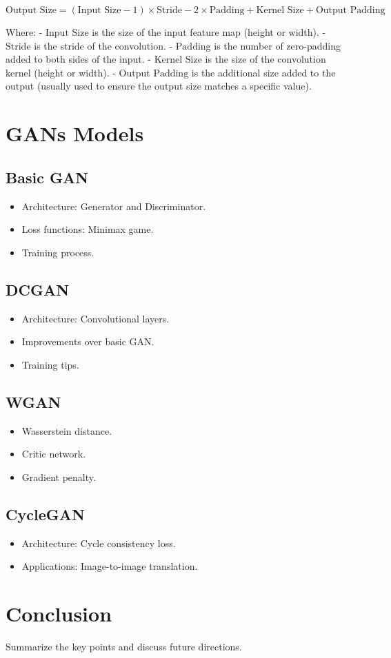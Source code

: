 \documentclass{article}
\begin{document}
\[ \text{Output Size} = (\text{Input Size} - 1) \times \text{Stride} - 2 \times \text{Padding} + \text{Kernel Size} + \text{Output Padding} \]

Where:
- \(\text{Input Size}\) is the size of the input feature map (height or width).
- \(\text{Stride}\) is the stride of the convolution.
- \(\text{Padding}\) is the number of zero-padding added to both sides of the input.
- \(\text{Kernel Size}\) is the size of the convolution kernel (height or width).
- \(\text{Output Padding}\) is the additional size added to the output (usually used to ensure the output size matches a specific value).


\section{GANs Models}
\label{sec:gans-models}
\subsection{Basic GAN}
\begin{itemize}
    \item Architecture: Generator and Discriminator.
    \item Loss functions: Minimax game.
    \item Training process.
\end{itemize}

\subsection{DCGAN}
\begin{itemize}
    \item Architecture: Convolutional layers.
    \item Improvements over basic GAN.
    \item Training tips.
\end{itemize}

\subsection{WGAN}
\begin{itemize}
    \item Wasserstein distance.
    \item Critic network.
    \item Gradient penalty.
\end{itemize}

\subsection{CycleGAN}
\begin{itemize}
    \item Architecture: Cycle consistency loss.
    \item Applications: Image-to-image translation.
\end{itemize}


\section{Conclusion}
\label{sec:conclusion}
Summarize the key points and discuss future directions.
\end{document}
